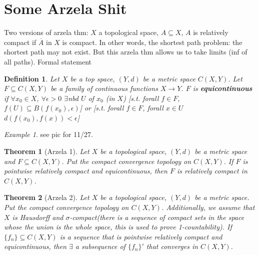 \documentclass[article,11pt, reqno]{article}
\newtheorem*{theorem}{Theorem}
\newtheorem*{definition}{Definition}
\theoremstyle{remark}
\newtheorem*{example}{Example}
\newcommand{\ra}{\rightarrow}
\newcommand{\<}{\langle}
\renewcommand{\>}{\rangle}
\newcommand{\ex}{\exists}
\begin{document}
\section{Some Arzela Shit}
Two versions of arzela thm: $X$ a topological space, $A\subseteq X$, $A$ is relatively compact if $\overline{A}$ in $X$ is compact. In other words, the shortest path problem: the shortest path may not exist. But this arzela thm allows us to take limits (inf of all paths). Formal statement
\begin{definition}
    Let $X$ be a top space, $(Y,d)$ be a metric space $C(X,Y)$. Let $F\subseteq C(X,Y)$ be a family of continuous functions $X\ra Y$. $F$ is \textbf{equicontinuous} if $\forall x_0\in X$, $\forall\epsilon>0$ $\exists$nbd $U$ of $x_0$ (in $X$) [s.t. forall $f\in F$, $f(U)\subseteq B(f(x_0),\epsilon)$] or [s.t. forall $f\in F$, forall $x\in U$ $d(f(x_0),f(x))<\epsilon$]
\end{definition}
\begin{example}
    see pic for 11/27.
\end{example}
\begin{theorem}[Arzela 1]
    Let $X$ be a topological space, $(Y,d)$ be a metric space and $F\subseteq C(X,Y)$. Put the compact convergence topology on $C(X,Y)$. If $F$ is pointwise relatively compact and equicontinuous, then $F$ is relatively compact in $C(X,Y)$.
\end{theorem}
\begin{theorem}[Arzela 2]
    Let $X$ be a topological space, $(Y,d)$ be a metric space. Put the compact convergence topology on $C(X,Y)$. Additionally, we assume that $X$ is Hausdorff and $\sigma$-compact(there is a sequence of compact sets in the space whose the union is the whole space, this is used to prove 1-countability). If $\{f_n\}\subseteq C(X,Y)$ is a sequence that is pointwise relatively compact and equicontinuous, then $\ex$ a subsequence of $\{f_n\}'$ that converges in $C(X,Y)$.
\end{theorem}
\bigskip
\end{document}
